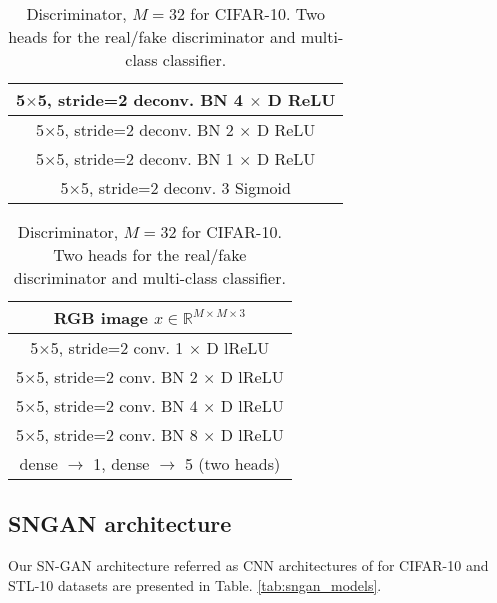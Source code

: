 \documentclass{article}
\newcommand{\bbR}{\mathbb{R}}
\begin{document}
\begin{table}[ht!]
\begin{subtable}{.32\linewidth}
{\begin{tabular}{c}
            \midrule
            5$\times$5, stride=2 deconv. BN 4 $\times$ D ReLU\\
			\midrule
            5$\times$5, stride=2 deconv. BN 2 $\times$ D ReLU\\
            \midrule
            5$\times$5, stride=2 deconv. BN 1 $\times$ D ReLU\\
            \midrule
            5$\times$5, stride=2 deconv. 3 Sigmoid\\	
            \midrule
			\bottomrule
		\end{tabular}}
        \caption{\label{tab:gen_dcgan}Generator for CIFAR-10}
    \end{subtable}
    \begin{subtable}{.34\linewidth}
    	\centering
    	{\begin{tabular}{c}
			\toprule
			\midrule
			RGB image $x\in \bbR^{M\times M \times 3}$ \\
            \midrule
            5$\times$5, stride=2 conv. 1 $\times$ D lReLU\\
            \midrule
            5$\times$5, stride=2 conv. BN 2 $\times$ D lReLU\\        		 	
			\midrule
            5$\times$5, stride=2 conv. BN 4 $\times$ D lReLU\\            	
            \midrule
            5$\times$5, stride=2 conv. BN 8 $\times$ D lReLU\\    
            \midrule
            dense $\rightarrow$ 1, dense $\rightarrow$ 5 (two heads) \\
            \midrule
			\bottomrule
		\end{tabular}}
        \caption{\label{tab:dis_dcgan}Discriminator, $M=32$ for CIFAR-10. Two heads for the real/fake discriminator and multi-class classifier.}
    \end{subtable}
\end{table}


\subsection{SNGAN architecture}

Our SN-GAN architecture referred as CNN architectures of \cite{miyato-iclr-2018} for CIFAR-10 and STL-10 datasets are presented in Table. \ref{tab:sngan_models}.
\end{document}
